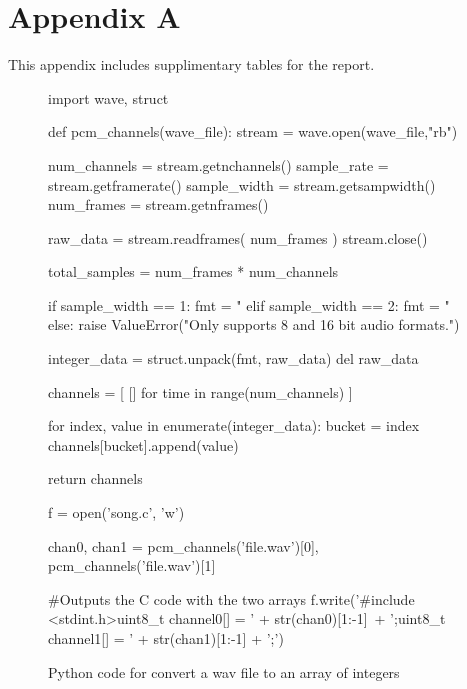 \section{Appendix A}
\label{appenix:a}

This appendix includes supplimentary tables for the report.

\begin{figure}[ht!]
\begin{code}
import wave, struct

def pcm_channels(wave_file):
    stream = wave.open(wave_file,"rb")

    num_channels = stream.getnchannels()
    sample_rate = stream.getframerate()
    sample_width = stream.getsampwidth()
    num_frames = stream.getnframes()

    raw_data = stream.readframes( num_frames )
    stream.close()

    total_samples = num_frames * num_channels

    if sample_width == 1: 
        fmt = "%
    elif sample_width == 2:
        fmt = "%
    else:
        raise ValueError("Only supports 8 and 16 bit audio formats.")

    integer_data = struct.unpack(fmt, raw_data)
    del raw_data

    channels = [ [] for time in range(num_channels) ]

    for index, value in enumerate(integer_data):
        bucket = index %
        channels[bucket].append(value)

    return channels

f = open('song.c', 'w')

chan0, chan1 = pcm_channels('file.wav')[0], pcm_channels('file.wav')[1]

#Outputs the C code with the two arrays
f.write('#include <stdint.h>\n\nconst uint8_t channel0[] = {' + str(chan0)[1:-1]\
 + '};\n\nconst uint8_t channel1[] = {' + str(chan1)[1:-1] + '};')

\end{code}
\caption{Python code for convert a wav file to an array of integers}
\label{fig:python}
\end{figure}
